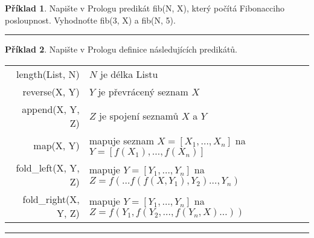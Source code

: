 \documentclass[a4paper]{article}
\theoremstyle{definition}
\newtheorem{priklad}{Příklad}
\begin{document}
\begin{priklad}
    Napište v Prologu predikát fib(N, X), který počítá Fibonacciho posloupnost. Vyhodnoťte fib(3, X) a fib(N, 5).
    
\noindent\rule{\linewidth}{.2pt}    
\end{priklad}

\begin{priklad}
    Napište v Prologu definice následujících predikátů.
    
    \begin{table}[htb]
      \begin{center}
        \begin{tabular}{r@{\qquad}l}
           length(List, N) & $ N $ je délka Listu \\
           reverse(X, Y) & $ Y $ je převrácený seznam $ X $ \\
           append(X, Y, Z) & $ Z $ je spojení seznamů $ X $ a $ Y $ \\
           map(X, Y) & mapuje seznam $ X = [X_1,\ldots,X_n] $ na $ Y = [f(X_1),\ldots,f(X_n)] $ \\
           fold\_left(X, Y, Z) & mapuje $ Y = [Y_1,\ldots,Y_n] $ na $ Z = f(\ldots f(f(X,Y_1),Y_2)\ldots,Y_n) $ \\
           fold\_right(X, Y, Z) & mapuje $ Y = [Y_1,\ldots,Y_n] $ na $ Z = f(Y_1,f(Y_2,\ldots,f(Y_n,X)\ldots)) $
        \end{tabular}
      \end{center}
    \end{table}
    
\noindent\rule{\linewidth}{.2pt}    
\end{priklad}
\end{document}
